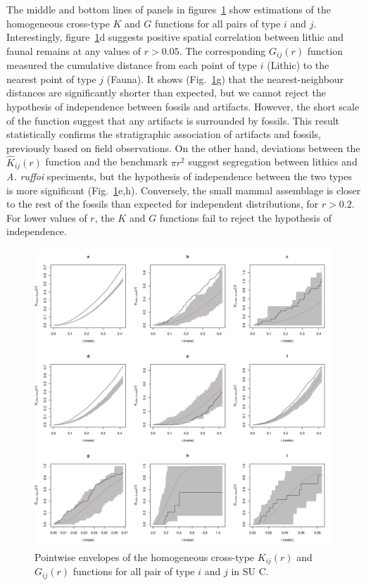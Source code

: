 \documentclass[review,authoryear]{elsarticle} %
\begin{document}
The middle and bottom lines of panels in figures~\ref{fig:7} show estimations of the homogeneous cross-type $K$ and $G$ functions for all pairs of type $i$ and $j$. Interestingly, figure~\ref{fig:7}d suggests positive spatial correlation between lithic and faunal remains at any values of $r>0.05$. The corresponding $G_{ij}(r)$ function measured the cumulative distance from each point of type $i$ (Lithic) to the nearest point of type $j$ (Fauna). It shows (Fig.~\ref{fig:7}g) that the nearest-neighbour distances are significantly shorter than expected, but we cannot reject the hypothesis of independence between fossils and artifacts. However, the short scale of the function suggest that any artifacts is surrounded by fossils. This result statistically confirms the stratigraphic association of artifacts and fossils, previously based on field observations. On the other hand, deviations between the $\hat{K}_{ij}(r)$ function and the benchmark $\pi r^2$ suggest segregation between lithics and \emph{A. ruffoi} speciments, but the hypothesis of independence between the two types is more significant (Fig.~\ref{fig:7}e,h). Conversely, the small mammal assemblage is closer to the rest of the fossils than expected for independent distributions, for $r>0.2$. For lower values of $r$, the $K$ and $G$ functions fail to reject the hypothesis of independence.

\begin{figure}
  \centering
  \includegraphics[width=1\textwidth]{../artwork/Fig7.pdf}
  \caption{Pointwise envelopes of the homogeneous cross-type $K_{ij}(r)$ and $G_{ij}(r)$ functions for all pair of type $i$ and $j$ in SU C.}
  \label{fig:7}
\end{figure}
\end{document}
